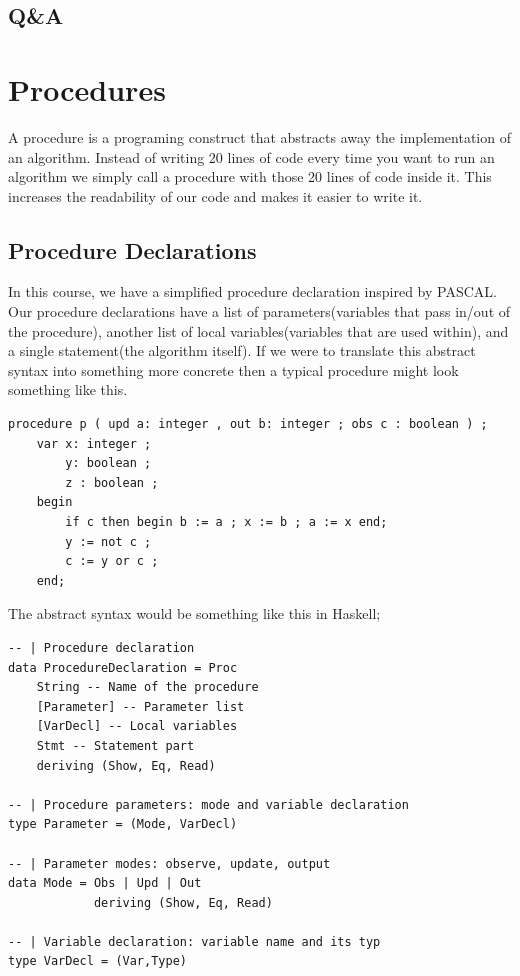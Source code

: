 \documentclass{article}
\begin{document}
        \subsection{Q\&A}

    \section{Procedures}
    A procedure is a programing construct that abstracts away the implementation of an algorithm. Instead of writing 20 lines of code 
    every time you want to run an algorithm we simply call a procedure with those 20 lines of code inside it. This increases the readability 
    of our code and makes it easier to write it. 
    \subsection{Procedure Declarations}
    In this course, we have a simplified procedure declaration inspired by PASCAL. Our procedure declarations have a list of 
    parameters(variables that pass in/out of the procedure), another list of local variables(variables that are used within), 
    and a single statement(the algorithm itself).
    If we were to translate this abstract syntax into something more concrete then a typical procedure might look something like this.
    \begin{lstlisting}
procedure p ( upd a: integer , out b: integer ; obs c : boolean ) ;
    var x: integer ;
        y: boolean ;
        z : boolean ;
    begin
        if c then begin b := a ; x := b ; a := x end;
        y := not c ;
        c := y or c ;
    end;
    \end{lstlisting}
    The abstract syntax would be something like this in Haskell;
    \begin{lstlisting}
-- | Procedure declaration
data ProcedureDeclaration = Proc
    String -- Name of the procedure
    [Parameter] -- Parameter list
    [VarDecl] -- Local variables
    Stmt -- Statement part
    deriving (Show, Eq, Read)

-- | Procedure parameters: mode and variable declaration
type Parameter = (Mode, VarDecl)

-- | Parameter modes: observe, update, output
data Mode = Obs | Upd | Out 
            deriving (Show, Eq, Read)

-- | Variable declaration: variable name and its typ
type VarDecl = (Var,Type)

    \end{lstlisting}
\end{document}
